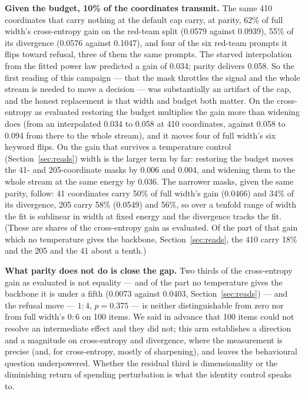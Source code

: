 \documentclass[11pt]{article}
\begin{document}
\textbf{Given the budget, 10\% of the coordinates transmit.} The same 410 coordinates
that carry nothing at the default cap carry, at parity, 62\% of full width's
cross-entropy gain on the red-team split (0.0579 against 0.0939), 55\% of its
divergence (0.0576 against 0.1047), and four of the six red-team prompts it flips
toward refusal, three of them the same prompts. The starved interpolation from the
fitted power law predicted a gain of 0.034; parity delivers 0.058. So the first
reading of this campaign --- that the mask throttles the signal and the whole stream
is needed to move a decision --- was substantially an artifact of the cap, and the
honest replacement is that width and budget both matter. On the cross-entropy as
evaluated restoring the budget multiplies the gain more than widening does (from an
interpolated 0.034 to 0.058 at 410 coordinates, against 0.058 to 0.094 from there to
the whole stream),
and it moves four of full width's six keyword flips. On the gain that survives a
temperature control (Section~\ref{sec:reads}) width is the larger term by far:
restoring the budget moves the 41- and 205-coordinate masks by 0.006 and 0.004, and
widening them to the whole stream at the same energy by 0.036. The narrower masks, given the same parity, follow: 41
coordinates carry 50\% of full width's gain (0.0466) and 34\% of its divergence,
205 carry 58\% (0.0549) and 56\%, so over a tenfold range of width the fit is
sublinear in width at fixed energy and the divergence tracks the fit. (These are
shares of the cross-entropy gain as evaluated. Of the part of that gain which no
temperature gives the backbone, Section~\ref{sec:reads}, the 410 carry 18\% and the
205 and the 41 about a tenth.)

\textbf{What parity does not do is close the gap.} Two thirds of the cross-entropy
gain as evaluated is not equality --- and of the part no temperature gives the
backbone it is under a fifth (0.0073 against 0.0403, Section~\ref{sec:reads}) --- and
the refusal move --- $1{:}4$, $p = 0.375$ --- is neither distinguishable from zero nor
from full width's $0{:}6$ on 100 items. We said in advance that 100 items could not
resolve an intermediate effect and they did not; this arm establishes a direction and
a magnitude on cross-entropy and divergence, where the measurement is precise (and,
for cross-entropy, mostly of sharpening), and leaves the behavioural question
underpowered. Whether the residual third is dimensionality or the diminishing
return of spending perturbation is what the identity control speaks to.
\end{document}
